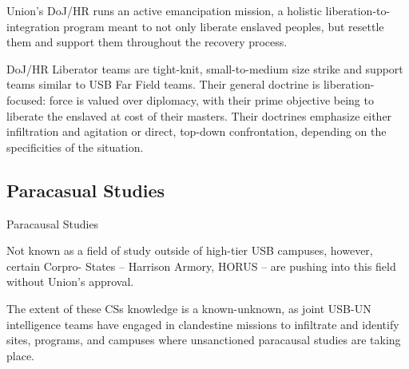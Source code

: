 Union’s DoJ/HR runs an active emancipation mission, a holistic liberation-to-integration program  
meant to not only liberate enslaved peoples, but resettle them and support them throughout the  
recovery process. 
 

DoJ/HR Liberator teams are tight-knit, small-to-medium size strike and support teams similar to  
USB Far Field teams. Their general doctrine is liberation-focused: force is valued over diplomacy,  
with their prime objective being to liberate the enslaved at cost of their masters. Their doctrines  
emphasize either infiltration and agitation or direct, top-down confrontation, depending on the  
specificities of the situation. 
 
\subsection{Paracasual Studies}
Paracausal Studies  

Not known as a field of study outside of high-tier USB campuses, however, certain Corpro- 
States -- Harrison Armory, HORUS -- are pushing into this field without Union’s approval. 
 

                                                                                                          


The extent of these CSs knowledge is a known-unknown, as joint USB-UN intelligence teams  
have engaged in clandestine missions to infiltrate and identify sites, programs, and campuses  
where unsanctioned paracausal studies are taking place.    
